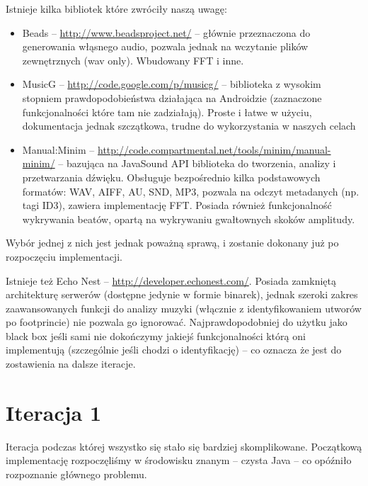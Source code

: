 \begin{Note}

Istnieje kilka bibliotek które zwróciły naszą uwagę:

\begin{itemize}
  \item Beads -- \url{http://www.beadsproject.net/} -- głównie przeznaczona do generowania włąsnego audio, pozwala jednak na wczytanie plików zewnętrznych (wav only). Wbudowany FFT i inne.
  \item MusicG -- \url{http://code.google.com/p/musicg/} -- biblioteka z wysokim stopniem prawdopodobieństwa działająca na Androidzie (zaznaczone funkcjonalności które tam nie zadziałają). Proste i łatwe w użyciu, dokumentacja jednak szczątkowa, trudne do wykorzystania w naszych celach
  \item Manual:Minim -- \url{http://code.compartmental.net/tools/minim/manual-minim/} -- bazująca na JavaSound API biblioteka do tworzenia, analizy i przetwarzania dźwięku. Obsługuje bezpośrednio kilka podstawowych formatów: WAV, AIFF, AU, SND, MP3, pozwala na odczyt metadanych (np. tagi ID3), zawiera implementację FFT. Posiada również funkcjonalność wykrywania beatów, opartą na wykrywaniu gwałtownych skoków amplitudy.
\end{itemize}

Wybór jednej z nich jest jednak poważną sprawą, i zostanie dokonany już po rozpoczęciu implementacji.

Istnieje też Echo Nest -- \url{http://developer.echonest.com/}. Posiada zamkniętą architekturę
serwerów (dostępne jedynie w formie binarek), jednak szeroki zakres zaawansowanych funkcji do
analizy muzyki (włącznie z identyfikowaniem utworów po footprincie) nie pozwala go ignorować.
Najprawdopodobniej do użytku jako black box jeśli sami nie dokończymy jakiejś funkcjonalności którą
oni implementują (szczególnie jeśli chodzi o identyfikację) -- co oznacza że jest do zostawienia na dalsze iteracje.

\end{Note}

\section{Iteracja 1}
Iteracja podczas której wszystko się stało się bardziej skomplikowane. Początkową implementację rozpoczęliśmy w środowisku
znanym -- czysta Java -- co opóźniło rozpoznanie głównego problemu.

